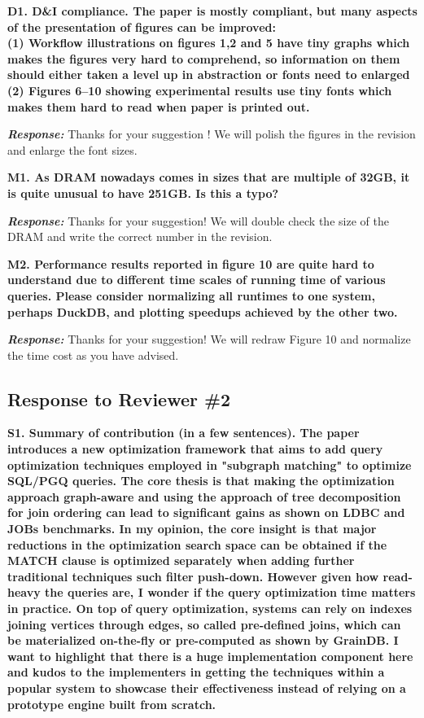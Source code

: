 \textbf{D1. D\&I compliance. 
The paper is mostly compliant, but many aspects of the presentation of figures can be improved: \\
(1) Workflow illustrations on figures 1,2 and 5 have tiny graphs which makes the figures very hard to comprehend, so information on them should either taken a level up in abstraction or fonts need to enlarged \\
(2) Figures 6--10 showing experimental results use tiny fonts which makes them hard to read when paper is printed out.}

\textbf{\textit{Response: }}
Thanks for your suggestion ! We will polish the figures in the revision and enlarge the font sizes.


\textbf{M1. As DRAM nowadays comes in sizes that are multiple of 32GB, it is quite unusual to have 251GB. Is this a typo?}

\textbf{\textit{Response: }}
Thanks for your suggestion! We will double check the size of the DRAM and write the correct number in the revision.

\textbf{M2. Performance results reported in figure 10 are quite hard to understand due to different time scales of running time of various queries. Please consider normalizing all runtimes to one system, perhaps DuckDB, and plotting speedups achieved by the other two.}

\textbf{\textit{Response: }}
Thanks for your suggestion! We will redraw Figure 10 and normalize the time cost as you have advised.


\subsection{Response to Reviewer \#2}

\textbf{S1. Summary of contribution (in a few sentences). 
The paper introduces a new optimization framework that aims to add query optimization techniques employed in "subgraph matching" to optimize SQL/PGQ queries. The core thesis is that making the optimization approach graph-aware and using the approach of tree decomposition for join ordering can lead to significant gains as shown on LDBC and JOBs benchmarks.
In my opinion, the core insight is that major reductions in the optimization search space can be obtained if the MATCH clause is optimized separately when adding further traditional techniques such filter push-down. However given how read-heavy the queries are, I wonder if the query optimization time matters in practice. On top of query optimization, systems can rely on indexes joining vertices through edges, so called pre-defined joins, which can be materialized on-the-fly or pre-computed as shown by GrainDB. I want to highlight that there is a huge implementation component here and kudos to the implementers in getting the techniques within a popular system to showcase their effectiveness instead of relying on a prototype engine built from scratch.}


